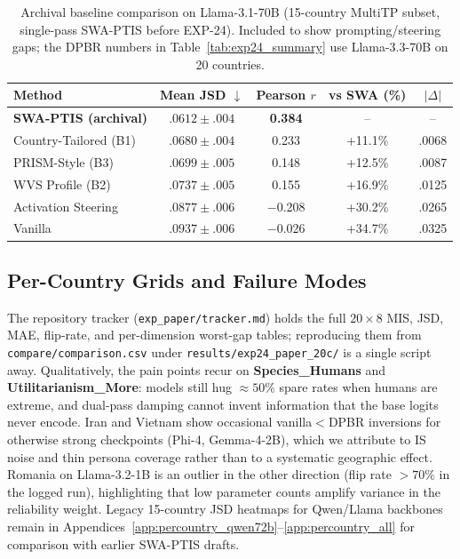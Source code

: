 \documentclass{article}
\begin{document}
\begin{table}[t]
\caption{Archival baseline comparison on Llama-3.1-70B (15-country MultiTP subset,
single-pass SWA-PTIS before EXP-24). Included to show prompting/steering gaps; the
DPBR numbers in Table~\ref{tab:exp24_summary} use Llama-3.3-70B on 20 countries.}
\label{tab:baselines}
\centering\small
\begin{tabular}{lcccc}
\toprule
Method & Mean JSD $\downarrow$ & Pearson $r$ & vs SWA (\%) & $|\Delta|$ \\
\midrule
\textbf{SWA-PTIS (archival)} & $\mathbf{.0612 \pm .004}$ & \textbf{0.384} & -- & -- \\
Country-Tailored (B1) & $.0680 \pm .004$ & 0.233 & +11.1\% & .0068 \\
PRISM-Style (B3)      & $.0699 \pm .005$ & 0.148 & +12.5\% & .0087 \\
WVS Profile (B2)      & $.0737 \pm .005$ & 0.155 & +16.9\% & .0125 \\
Activation Steering   & $.0877 \pm .006$ & $-$0.208 & +30.2\% & .0265 \\
Vanilla               & $.0937 \pm .006$ & $-$0.026 & +34.7\% & .0325 \\
\bottomrule
\end{tabular}
\end{table}

\subsection{Per-Country Grids and Failure Modes}
\label{sec:percountry_main}

The repository tracker (\texttt{exp\_paper/tracker.md}) holds the full $20\times 8$
MIS, JSD, MAE, flip-rate, and per-dimension worst-gap tables; reproducing them from
\texttt{compare/comparison.csv} under \texttt{results/exp24\_paper\_20c/} is a
single script away. Qualitatively, the pain points recur on \textbf{Species\_Humans}
and \textbf{Utilitarianism\_More}: models still hug $\approx 50\%$ spare rates when
humans are extreme, and dual-pass damping cannot invent information that the base
logits never encode. Iran and Vietnam show occasional vanilla${<}$DPBR inversions
for otherwise strong checkpoints (Phi-4, Gemma-4-2B), which we attribute to IS noise
and thin persona coverage rather than to a systematic geographic effect. Romania on
Llama-3.2-1B is an outlier in the other direction (flip rate ${>}70\%$ in the
logged run), highlighting that low parameter counts amplify variance in the
reliability weight. Legacy 15-country JSD heatmaps for Qwen/Llama backbones remain in
Appendices~\ref{app:percountry_qwen72b}--\ref{app:percountry_all} for comparison with
earlier SWA-PTIS drafts.
\end{document}
